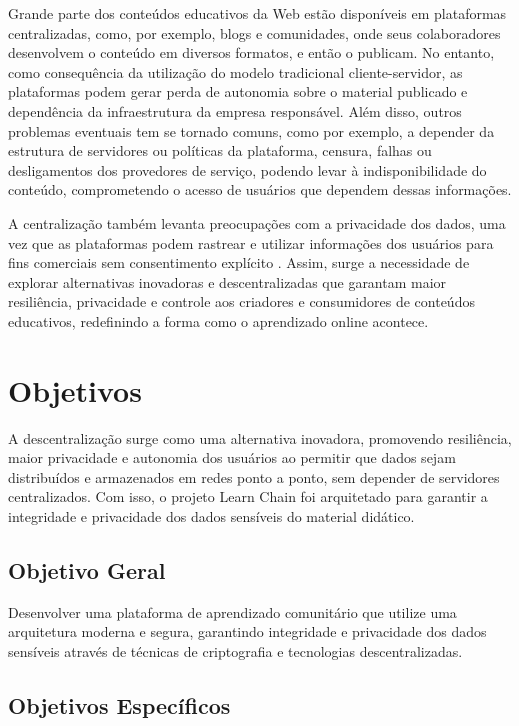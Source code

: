 Grande parte dos conteúdos educativos da Web estão disponíveis em plataformas centralizadas, como, por exemplo, blogs e comunidades, onde seus colaboradores desenvolvem o conteúdo em diversos formatos, e então o publicam. No entanto, como consequência da utilização do modelo tradicional cliente-servidor, as plataformas podem gerar perda de autonomia sobre o material publicado e dependência da infraestrutura da empresa responsável. Além disso, outros problemas eventuais tem se tornado comuns, como por exemplo, a depender da estrutura de servidores ou políticas da plataforma, censura, falhas ou desligamentos dos provedores de serviço, podendo levar à indisponibilidade do conteúdo, comprometendo o acesso de usuários que dependem dessas informações. 

A centralização também levanta preocupações com a privacidade dos dados, uma vez que as plataformas podem rastrear e utilizar informações dos usuários para fins comerciais sem consentimento explícito \cite{beiro2020}. Assim, surge a necessidade de explorar alternativas inovadoras e descentralizadas que garantam maior resiliência, privacidade e controle aos criadores e consumidores de conteúdos educativos, redefinindo a forma como o aprendizado online acontece. 

\section{Objetivos}

A descentralização surge como uma alternativa inovadora, promovendo resiliência, maior privacidade e autonomia dos usuários ao permitir que dados sejam distribuídos e armazenados em redes ponto a ponto, sem depender de servidores centralizados. Com isso, o projeto Learn Chain foi arquitetado para garantir a integridade e privacidade dos dados sensíveis do material didático. 

\subsection{Objetivo Geral}

Desenvolver uma plataforma de aprendizado comunitário que utilize uma arquitetura moderna e segura, garantindo integridade e privacidade dos dados sensíveis através de técnicas de criptografia e tecnologias descentralizadas.

\subsection{Objetivos Específicos}


